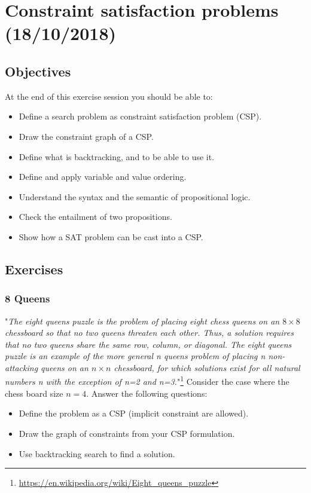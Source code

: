 \documentclass[a4paper, 10pt]{article}
\begin{document}

   \newpage
   \setcounter{page}{1}
   \section{Constraint satisfaction problems (18/10/2018)}
   \subsection{Objectives}
   At the end of this exercise session you should be able to:
   \begin{itemize}
       \item Define a search problem as constraint satisfaction problem (CSP).
       \item Draw the constraint graph of a CSP.
       \item Define what is backtracking, and to be able to use it.
       \item Define and apply variable and value ordering.
       \item Understand the syntax and the semantic of propositional logic.
       \item Check the entailment of two propositions.
       \item Show how a SAT problem can be cast into a CSP.
       
   \end{itemize}
   \subsection{Exercises}
   \subsubsection{8 Queens}
   "\textit{The eight queens puzzle is the problem of placing eight chess queens on an $8\times8$ chessboard so that no two queens threaten each other. Thus, a solution requires that no two queens share the same row, column, or diagonal. The eight queens puzzle is an example of the more general n queens problem of placing n non-attacking queens on an $n\times n$ chessboard, for which solutions exist for all natural numbers n with the exception of n=2 and n=3.}"\footnote{\url{https://en.wikipedia.org/wiki/Eight\_queens\_puzzle}}
   Consider the case where the chess board size $n = 4$. Answer the following questions:
   \begin{itemize}
       \item Define the problem as a CSP (implicit constraint are allowed).
       \item Draw the graph of constraints from your CSP formulation.
       \item Use backtracking search to find a solution.
   \end{itemize}
\end{document}
